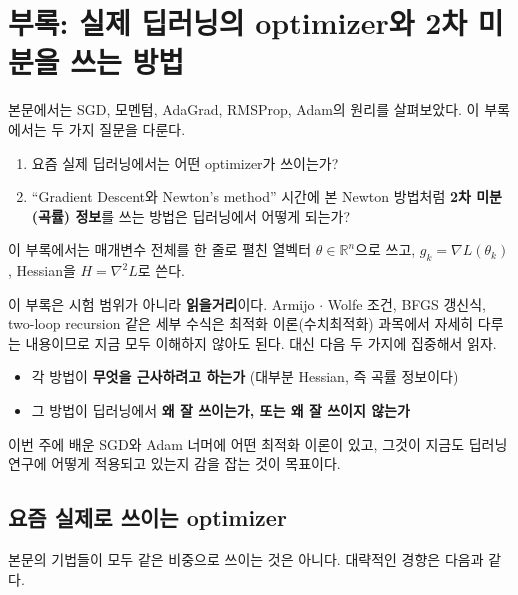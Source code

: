 \documentclass[11pt,a4paper]{article}
\newcommand{\R}{\mathbb{R}}
\begin{document}
\appendix
\section{부록: 실제 딥러닝의 optimizer와 2차 미분을 쓰는 방법}\label{app:opt}

본문에서는 SGD, 모멘텀, AdaGrad, RMSProp, Adam의 원리를 살펴보았다.
이 부록에서는 두 가지 질문을 다룬다.
\begin{enumerate}[label=(\arabic*)]
\item 요즘 실제 딥러닝에서는 어떤 optimizer가 쓰이는가?
\item ``Gradient Descent와 Newton's method'' 시간에 본 Newton 방법처럼
\textbf{2차 미분(곡률) 정보}를 쓰는 방법은 딥러닝에서 어떻게 되는가?
\end{enumerate}
이 부록에서는 매개변수 전체를 한 줄로 펼친 열벡터 $\theta\in\R^n$으로 쓰고,
$g_k=\nabla L(\theta_k)$, Hessian을 $H=\nabla^2L$로 쓴다.

\begin{remarkbox}[이 부록을 읽는 방법]
이 부록은 시험 범위가 아니라 \textbf{읽을거리}이다.
Armijo $\cdot$ Wolfe 조건, BFGS 갱신식, two-loop recursion 같은 세부 수식은
최적화 이론(수치최적화) 과목에서 자세히 다루는 내용이므로 지금 모두 이해하지 않아도 된다.
대신 다음 두 가지에 집중해서 읽자.
\begin{itemize}[leftmargin=1.5em]
\item 각 방법이 \textbf{무엇을 근사하려고 하는가} (대부분 Hessian, 즉 곡률 정보이다)
\item 그 방법이 딥러닝에서 \textbf{왜 잘 쓰이는가, 또는 왜 잘 쓰이지 않는가}
\end{itemize}
이번 주에 배운 SGD와 Adam 너머에 어떤 최적화 이론이 있고,
그것이 지금도 딥러닝 연구에 어떻게 적용되고 있는지 감을 잡는 것이 목표이다.
\end{remarkbox}

\subsection{요즘 실제로 쓰이는 optimizer}

본문의 기법들이 모두 같은 비중으로 쓰이는 것은 아니다.
대략적인 경향은 다음과 같다.
\end{document}
